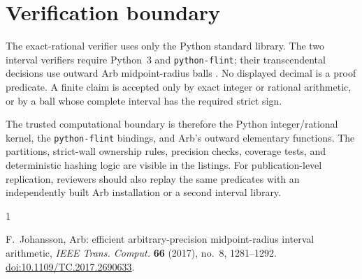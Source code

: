 \documentclass[11pt]{article}
\numberwithin{equation}{section}
\theoremstyle{definition}
\theoremstyle{remark}
\begin{document}
\section{Verification boundary}

The exact-rational verifier uses only the Python standard library.  The two
interval verifiers require Python~3 and \texttt{python-flint}; their
transcendental decisions use outward Arb midpoint-radius balls
\cite{Johansson2017}.  No displayed decimal is a proof predicate.  A finite
claim is accepted only by exact integer or rational arithmetic, or by a ball
whose complete interval has the required strict sign.

The trusted computational boundary is therefore the Python integer/rational
kernel, the \texttt{python-flint} bindings, and Arb's outward elementary
functions.  The partitions, strict-wall ownership rules, precision checks,
coverage tests, and deterministic hashing logic are visible in the listings.
For publication-level replication, reviewers should also replay the same
predicates with an independently built Arb installation or a second interval
library.

\begin{thebibliography}{1}

F.~Johansson,
\newblock Arb: efficient arbitrary-precision midpoint-radius interval
arithmetic,
\newblock \emph{IEEE Trans. Comput.} \textbf{66} (2017), no.~8, 1281--1292.
\newblock \href{https://doi.org/10.1109/TC.2017.2690633}{doi:10.1109/TC.2017.2690633}.

\end{thebibliography}
\end{document}
